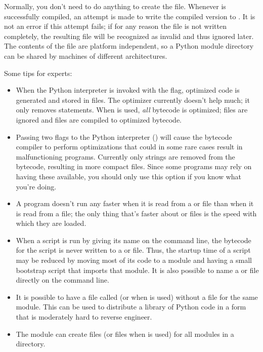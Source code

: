 \documentclass{manual}
\begin{document}
Normally, you don't need to do anything to create the
 file.  Whenever  is successfully
compiled, an attempt is made to write the compiled version to
.  It is not an error if this attempt fails; if for any
reason the file is not written completely, the resulting
 file will be recognized as invalid and thus ignored
later.  The contents of the  file are platform
independent, so a Python module directory can be shared by machines of
different architectures.

Some tips for experts:

\begin{itemize}

\item
When the Python interpreter is invoked with the  flag,
optimized code is generated and stored in  files.  The
optimizer currently doesn't help much; it only removes
 statements.  When  is used, \emph{all}
bytecode is optimized;  files are ignored and 
files are compiled to optimized bytecode.

\item
Passing two  flags to the Python interpreter
() will cause the bytecode compiler to perform
optimizations that could in some rare cases result in malfunctioning
programs.  Currently only  strings are removed from the
bytecode, resulting in more compact  files.  Since some
programs may rely on having these available, you should only use this
option if you know what you're doing.

\item
A program doesn't run any faster when it is read from a  or
 file than when it is read from a  file; the only
thing that's faster about  or  files is the
speed with which they are loaded.

\item
When a script is run by giving its name on the command line, the
bytecode for the script is never written to a  or
 file.  Thus, the startup time of a script may be reduced
by moving most of its code to a module and having a small bootstrap
script that imports that module.  It is also possible to name a
 or  file directly on the command line.

\item
It is possible to have a file called  (or
 when  is used) without a file
 for the same module.  This can be used to distribute a
library of Python code in a form that is moderately hard to reverse
engineer.

\item
The module %
{}  can create  files (or
 files when  is used) for all modules in a
directory.

\end{itemize}
\end{document}
